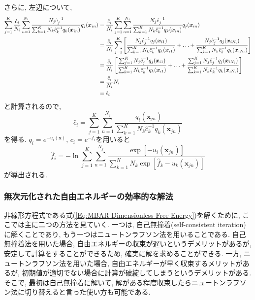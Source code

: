 さらに, 左辺について, 
\begin{align}
\begin{split}
    \sum_{j=1}^{K}
    \frac{\hat{c}_{i}}{N_{i}}
    \sum_{n=1}^{N_{i}}
    \frac{N_{j}\hat{c}_{j}^{-1}}{\sum_{k=1}^{K} N_{k} \hat{c}_{k}^{-1} q_{k}(\bm{x}_{in})}
    q_{j}(\bm{x}_{in})
    &=
    \frac{\hat{c}_{i}}{N_{i}}
    \sum_{j=1}^{K}
    \sum_{n=1}^{N_{i}}
    \frac{N_{j}\hat{c}_{j}^{-1}}{\sum_{k=1}^{K} N_{k} \hat{c}_{k}^{-1} q_{k}(\bm{x}_{in})}
    q_{j}(\bm{x}_{in})
    \\ &=
    \frac{\hat{c}_{i}}{N_{i}}
    \sum_{j=1}^{K}
    \left[
        \frac
        {N_{j}\hat{c}_{j}^{-1} q_{j}(\bm{x}_{i1})}
        {\sum_{k=1}^{K} N_{k} \hat{c}_{k}^{-1} q_{k}(\bm{x}_{i1})}
        + \ldots +
        \frac
        {N_{j}\hat{c}_{j}^{-1} q_{j}(\bm{x}_{i N_{i}})}
        {\sum_{k=1}^{K} N_{k} \hat{c}_{k}^{-1} q_{k}(\bm{x}_{i N_{i}})}
    \right]
    \\ &=
    \frac{\hat{c}_{i}}{N_{i}}
    \left[
        \frac
        {\sum_{j=1}^{K} N_{j}\hat{c}_{j}^{-1} q_{j}(\bm{x}_{i1})}
        {\sum_{k=1}^{K} N_{k} \hat{c}_{k}^{-1} q_{k}(\bm{x}_{i1})}
        + \ldots +
        \frac
        {\sum_{j=1}^{K} N_{j}\hat{c}_{j}^{-1} q_{j}(\bm{x}_{i N_{i}})}
        {\sum_{k=1}^{K} N_{k} \hat{c}_{k}^{-1} q_{k}(\bm{x}_{i N_{i}})}
    \right]
    \\ &=
    \frac{\hat{c}_{i}}{N_{i}} N_{i}
    \\ &=
    \hat{c}_{i}
    \notag
\end{split}
\end{align}
と計算されるので, 
\begin{equation}
    \hat{c}_{i}
    =
    \sum_{j=1}^{K}
    \sum_{n=1}^{N_{j}}
    \frac{q_{i}(\bm{x}_{jn})}{\sum_{k=1}^{K} N_{k} \hat{c}_{k}^{-1} q_{k}(\bm{x}_{jn})}
\end{equation}
を得る. $q_{i} = e^{-u_{i}(\bm{x})}$, $c_{i} = e^{-f_{i}}$を用いると
\begin{equation}
    \hat{f}_{i} =
    -\ln \sum_{j=1}^{K} \sum_{n=1}^{N_{j}}
    \frac
    {\exp[-u_{i}(\bm{x}_{jn})]}
    {\sum_{k=1}^{K} N_{k} \exp[\hat{f}_{k} - u_{k}(\bm{x}_{jn})]}
\end{equation}
が導出される. 

\subsubsection{無次元化された自由エネルギーの効率的な解法}
非線形方程式である式(\ref{Eq:MBAR-Dimensionless-Free-Energy})を解くために, ここでは主に二つの方法を見ていく. 
一つは, 自己無撞着(self-consistent iteration)に解くことであり, もう一つはニュートンラフソン法を用いることである. 
自己無撞着法を用いた場合, 自由エネルギーの収束が遅いというデメリットがあるが, 安定して計算をすることができるため, 確実に解を求めることができる. 一方, ニュートンラフソン法を用いた場合, 自由エネルギーが早く収束するメリットがあるが, 初期値が適切でない場合に計算が破綻してしまうというデメリットがある. そこで, 最初は自己無撞着に解いて, 解がある程度収束したらニュートンラフソン法に切り替えると言った使い方も可能である. 

